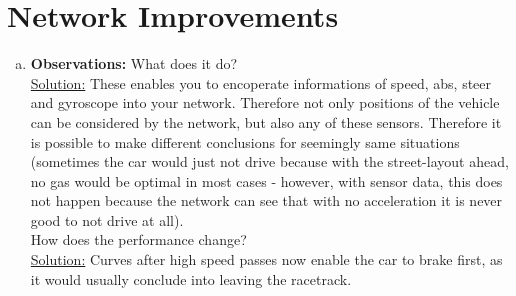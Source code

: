 \documentclass[DIN, pagenumber=false, fontsize=11pt, parskip=half]{scrartcl}
\newcommand{\sol}{\underline{Solution:} }
\begin{document}
\section{Network Improvements}
\begin{enumerate}[a)]
	\item \textbf{Observations:} What does it do?\\\sol
          These enables you to encoperate informations of speed, abs, steer and gyroscope into your network.
          Therefore not only positions of the vehicle can be considered by the network, but also any of these sensors.
          Therefore it is possible to make different conclusions for seemingly same situations (sometimes the car would
          just not drive because with the street-layout ahead, no gas would be optimal in most cases - however, with
          sensor data, this does not happen because the network can see that with no acceleration it is never good to
          not drive at all).\\
	
	How does the performance change?
	\\\sol Curves after high speed passes now enable the car to brake first, as it would usually conclude into leaving the racetrack.	
\end{enumerate}
\end{document}
